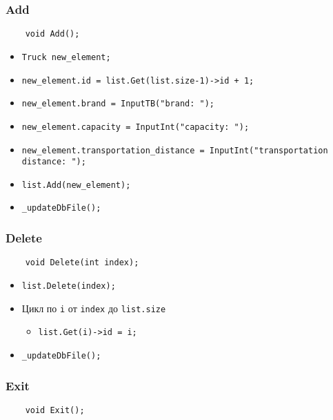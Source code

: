 \subsubsection{Add}

\begin{lstlisting}
    void Add();
\end{lstlisting}

\begin{itemize}
    \item \verb|Truck new_element;|
    \item \verb|new_element.id = list.Get(list.size-1)->id + 1;|
    \item \verb|new_element.brand = InputTB("brand: ");|
    \item \verb|new_element.capacity = InputInt("capacity: ");|
    \item \verb|new_element.transportation_distance = InputInt("transportation distance: ");|
    \item \verb|list.Add(new_element);|
    \item \verb|_updateDbFile();|
\end{itemize}

\subsubsection{Delete}

\begin{lstlisting}
    void Delete(int index);
\end{lstlisting}

\begin{itemize}
    \item \verb|list.Delete(index);|
    \item Цикл по \verb|i| от \verb|index| до \verb|list.size| 
    \begin{itemize}
        \item \verb|list.Get(i)->id = i;|
    \end{itemize}
    \item \verb|_updateDbFile();|
\end{itemize}

\subsubsection{Exit}

\begin{lstlisting}
    void Exit();
\end{lstlisting}

